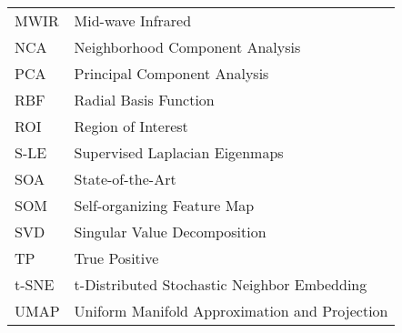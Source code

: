 \begin{tabular}{l p{5in}}
MWIR & Mid-wave Infrared\\
NCA & Neighborhood Component Analysis\\
PCA & Principal Component Analysis\\
RBF & Radial Basis Function\\
ROI & Region of Interest\\
S-LE & Supervised Laplacian Eigenmaps\\
SOA & State-of-the-Art\\
SOM & Self-organizing Feature Map\\
SVD & Singular Value Decomposition\\
TP & True Positive\\
t-SNE & t-Distributed Stochastic Neighbor Embedding\\
UMAP & Uniform Manifold Approximation and Projection\\

 \end{tabular}



\doublespacing

